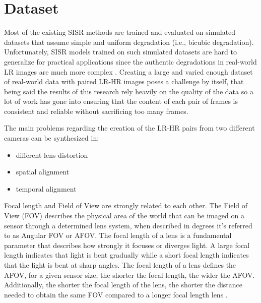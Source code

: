 \newpage
\chapter{Dataset}
\label{cha:dataset}

Most of the existing SISR methods are trained and evaluated on simulated datasets that assume simple and uniform degradation (i.e., bicubic degradation). Unfortunately, SISR models trained on such simulated datasets are hard to generalize for practical applications since the authentic degradations in real-world LR images are much more complex \cite{cai2019realworld}. Creating a large and varied enough dataset of real-world data with paired LR-HR images poses a challenge by itself, that being said the results of this research rely heavily on the quality of the data so a lot of work has gone into ensuring that the content of each pair of frames is consistent and reliable without sacrificing too many frames.

The main problems regarding the creation of the LR-HR pairs from two different cameras can be synthesized in:
\begin{itemize}
  \item different lens distortion
  \item spatial alignment
  \item temporal alignment
\end{itemize}

Focal length and Field of View are strongly related to each other. The Field of View (FOV) describes the physical area of the world that can be imaged on a sensor through a determined lens system, when described in degrees it's referred to as Angular FOV or AFOV.
The focal length of a lens is a fundamental parameter that describes how strongly it focuses or diverges light. A large focal length indicates that light is bent gradually while a short focal length indicates that the light is bent at sharp angles.
The focal length of a lens defines the AFOV, for a given sensor size, the shorter the focal length, the wider the AFOV. Additionally, the shorter the focal length of the lens, the shorter the distance needed to obtain the same FOV compared to a longer focal length lens \cite{flength}.


